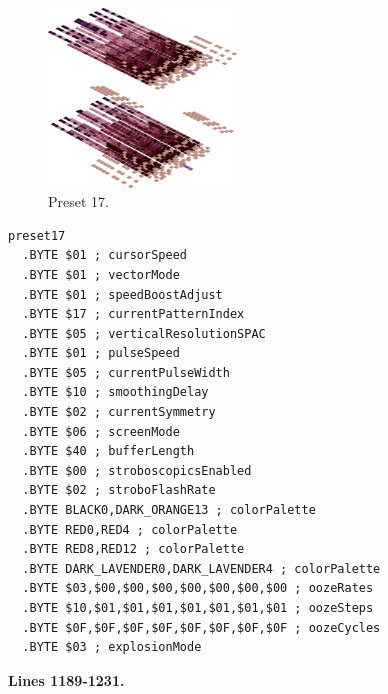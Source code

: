 \vspace*{-0.5cm}
\begin{minipage}[b]{0.48\linewidth}
\begin{figure}[H]                                                          
  \centering                                                             
  \begin{adjustbox}{width=5cm,center}                                   
  \includegraphics[width=5cm]{src/colorspace_presets/preset17-45.png}%
  \end{adjustbox}                                                        
\caption*{Preset 17.}                                           
\end{figure}                                                               
\end{minipage}
\hspace{0.1cm}
\begin{minipage}[b]{0.48\linewidth}                                                                         
\begin{lstlisting}[basicstyle=\ttfamily\tiny]
preset17
  .BYTE $01 ; cursorSpeed
  .BYTE $01 ; vectorMode
  .BYTE $01 ; speedBoostAdjust
  .BYTE $17 ; currentPatternIndex
  .BYTE $05 ; verticalResolutionSPAC
  .BYTE $01 ; pulseSpeed
  .BYTE $05 ; currentPulseWidth
  .BYTE $10 ; smoothingDelay
  .BYTE $02 ; currentSymmetry
  .BYTE $06 ; screenMode
  .BYTE $40 ; bufferLength
  .BYTE $00 ; stroboscopicsEnabled
  .BYTE $02 ; stroboFlashRate
  .BYTE BLACK0,DARK_ORANGE13 ; colorPalette
  .BYTE RED0,RED4 ; colorPalette
  .BYTE RED8,RED12 ; colorPalette
  .BYTE DARK_LAVENDER0,DARK_LAVENDER4 ; colorPalette
  .BYTE $03,$00,$00,$00,$00,$00,$00,$00 ; oozeRates
  .BYTE $10,$01,$01,$01,$01,$01,$01,$01 ; oozeSteps
  .BYTE $0F,$0F,$0F,$0F,$0F,$0F,$0F,$0F ; oozeCycles
  .BYTE $03 ; explosionMode
\end{lstlisting}
\end{minipage}
\clearpage
\textbf{Lines 1189-1231. } 
